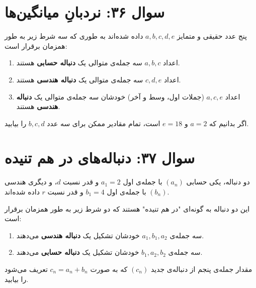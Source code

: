 \documentclass[12pt]{article}
\begin{document}
	\section*{سوال ۳۶: نردبانِ میانگین‌ها }
	پنج عدد حقیقی و متمایز \(a, b, c, d, e\) داده شده‌اند به طوری که سه شرط زیر به طور همزمان برقرار است:
	\begin{enumerate}[label=(\roman*)]
		\item اعداد \(a, b, c\) سه جمله‌ی متوالی یک \textbf{دنباله حسابی} هستند.
		\item اعداد \(c, d, e\) سه جمله‌ی متوالی یک \textbf{دنباله هندسی} هستند.
		\item اعداد \(a, c, e\) (جملات اول، وسط و آخر) خودشان سه جمله‌ی متوالی یک \textbf{دنباله هندسی} هستند.
	\end{enumerate}
	اگر بدانیم که \(a = 2\) و \(e = 18\) است، تمام مقادیر ممکن برای سه عدد \(b, c, d\) را بیابید.
	
	\vspace{1cm}
	\hrulefill
	\vspace{1cm}
	
	\section*{سوال ۳۷: دنباله‌های در هم تنیده }
	دو دنباله، یکی حسابی \( (a_n) \) با جمله‌ی اول \(a_1 = 2\) و قدر نسبت \(d\)، و دیگری هندسی \( (b_n) \) با جمله‌ی اول \(b_1 = 4\) و قدر نسبت \(r\) داده شده‌اند.
	\vspace{0.5cm}
	
	این دو دنباله به گونه‌ای "در هم تنیده" هستند که دو شرط زیر به طور همزمان برقرار است:
	\begin{enumerate}[label=(\roman*)]
		\item سه جمله‌ی \(a_1, b_1, a_2\) خودشان تشکیل یک \textbf{دنباله هندسی} می‌دهند.
		\item سه جمله‌ی \(b_1, a_2, b_2\) خودشان تشکیل یک \textbf{دنباله حسابی} می‌دهند.
	\end{enumerate}
	\vspace{0.5cm}
	
	مقدار جمله‌ی پنجم از دنباله‌ی جدید \( (c_n) \) که به صورت \(c_n = a_n + b_n\) تعریف می‌شود را بیابید.
	
	\vspace{1cm}
	\hrulefill
	\vspace{1cm}
	
\end{document}
